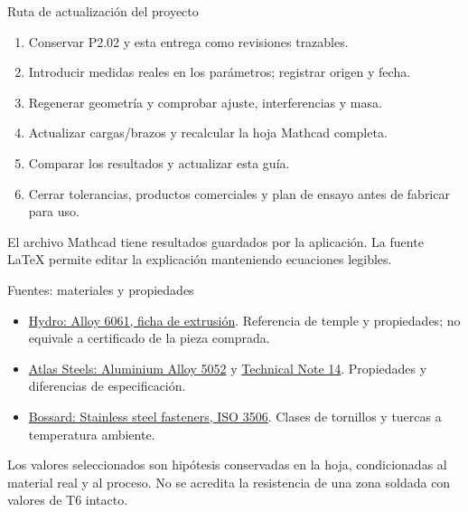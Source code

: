 \documentclass[10pt,aspectratio=169]{beamer}
\newcommand{\mcref}{Guía de diseño}
\begin{document}
\gdef\mcref{Mathcad: sección 27 / pág. 45}
\begin{frame}[t]{Ruta de actualización del proyecto}

\begin{enumerate}
\item Conservar P2.02 y esta entrega como revisiones trazables.
\item Introducir medidas reales en los parámetros; registrar origen y fecha.
\item Regenerar geometría y comprobar ajuste, interferencias y masa.
\item Actualizar cargas/brazos y recalcular la hoja Mathcad completa.
\item Comparar los resultados y actualizar esta guía.
\item Cerrar tolerancias, productos comerciales y plan de ensayo antes de fabricar para uso.
\end{enumerate}
El archivo Mathcad tiene resultados guardados por la aplicación. La fuente LaTeX permite editar la explicación manteniendo ecuaciones legibles.

\end{frame}

\gdef\mcref{Guía de diseño}
\begin{frame}[t]{Fuentes: materiales y propiedades}

\small
\begin{itemize}
\item \href{https://www.hydro.com/globalassets/01-products--services/extruded-profiles/americas/ena-resources/alloy-data-sheets/hydro_2019_data_sheet_6061.pdf}{Hydro: Alloy 6061, ficha de extrusión}. Referencia de temple y propiedades; no equivale a certificado de la pieza comprada.
\item \href{https://atlassteels.com.au/wp-content/uploads/2021/08/Aluminium-Alloy-5052-Data-Sheet-24-06-21.pdf}{Atlas Steels: Aluminium Alloy 5052} y \href{https://www.atlassteels.com.au/documents/TN14-5052\%20and\%205251\%20rev\%20June\%202013.pdf}{Technical Note 14}. Propiedades y diferencias de especificación.
\item \href{https://www.bossard.com/-/media/bossard-group/website/documents/technical-resources-old/stainless-steel-fasteners.pdf}{Bossard: Stainless steel fasteners, ISO 3506}. Clases de tornillos y tuercas a temperatura ambiente.
\end{itemize}
Los valores seleccionados son hipótesis conservadas en la hoja, condicionadas al material real y al proceso. No se acredita la resistencia de una zona soldada con valores de T6 intacto.

\end{frame}
\end{document}
